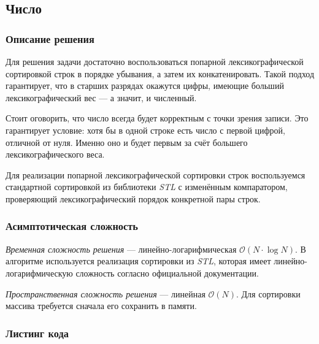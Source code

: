 \subsection{Число}

\subsubsection{Описание решения}

Для решения задачи достаточно воспользоваться попарной лексикографической сортировкой строк в порядке убывания, а затем их конкатенировать. Такой подход гарантирует, что в старших разрядах окажутся цифры, имеющие больший лексикографический вес --- а значит, и численный.

Стоит оговорить, что число всегда будет корректным с точки зрения записи. Это гарантирует условие: хотя бы в одной строке есть число с первой цифрой, отличной от нуля. Именно оно и будет первым за счёт большего лексикографического веса.

Для реализации попарной лексикографической сортировки строк воспользуемся стандартной сортировкой из библиотеки \textit{STL} с изменённым компаратором, проверяющий лексикографический порядок конкретной пары строк.

\subsubsection{Асимптотическая сложность}

\textit{Временная сложность решения} --- линейно-логарифмическая \( \mathcal{O}(N\cdot\log N) \). В алгоритме используется реализация сортировки из \textit{STL}, которая имеет линейно-логарифмическую сложность согласно официальной документации.

\textit{Пространственная сложность решения} --- линейная \( \mathcal{O}(N) \). Для сортировки массива требуется сначала его сохранить в памяти.

\subsubsection{Листинг кода}

